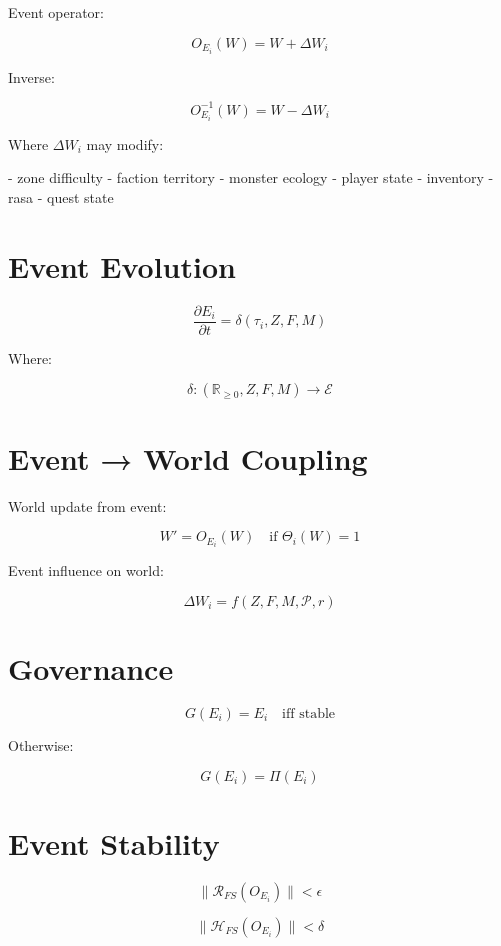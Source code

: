 Event operator:

\[
O_{E_i}(W)
= W + \Delta W_i
\]

Inverse:

\[
O_{E_i}^{-1}(W)
= W - \Delta W_i
\]

Where \(\Delta W_i\) may modify:

- zone difficulty  
- faction territory  
- monster ecology  
- player state  
- inventory  
- rasa  
- quest state  


\section*{Event Evolution}

\[
\frac{\partial E_i}{\partial t}
= \delta(\tau_i, Z, F, M)
\]

Where:

\[
\delta : (\mathbb{R}_{\ge 0}, Z, F, M) \to \mathcal{E}
\]


\section*{Event → World Coupling}

World update from event:

\[
W' = O_{E_i}(W)
\quad \text{if } \Theta_i(W) = 1
\]

Event influence on world:

\[
\Delta W_i
= f(Z, F, M, \mathcal{P}, r)
\]


\section*{Governance}

\[
G(E_i) = E_i
\quad \text{iff stable}
\]

Otherwise:

\[
G(E_i) = \Pi(E_i)
\]


\section*{Event Stability}

\[
\|\mathcal{R}_{FS}(O_{E_i})\| < \epsilon
\]

\[
\|\mathcal{H}_{FS}(O_{E_i})\| < \delta
\]

